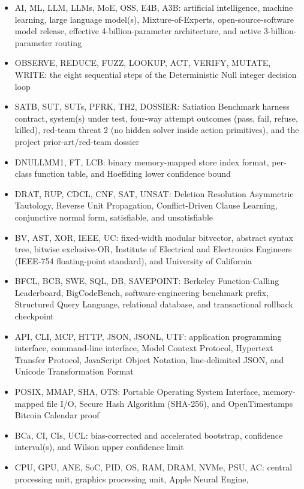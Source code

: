 \documentclass[10pt,letterpaper]{article}
\providecommand{\tightlist}{\setlength{\itemsep}{1pt}\setlength{\parskip}{0pt}}
\begin{document}
\begin{itemize}
\tightlist
\item
  AI, ML, LLM, LLMs, MoE, OSS, E4B, A3B: artificial intelligence,
  machine learning, large language model(s), Mixture-of-Experts,
  open-source-software model release, effective 4-billion-parameter
  architecture, and active 3-billion-parameter routing
\item
  OBSERVE, REDUCE, FUZZ, LOOKUP, ACT, VERIFY, MUTATE, WRITE: the eight
  sequential steps of the Deterministic Null integer decision loop
\item
  SATB, SUT, SUTs, PFRK, TH2, DOSSIER: Satiation Benchmark harness
  contract, system(s) under test, four-way attempt outcomes (pass, fail,
  refuse, killed), red-team threat 2 (no hidden solver inside action
  primitives), and the project prior-art/red-team dossier
\item
  DNULLMM1, FT, LCB: binary memory-mapped store index format, per-class
  function table, and Hoeffding lower confidence bound
\item
  DRAT, RUP, CDCL, CNF, SAT, UNSAT: Deletion Resolution Asymmetric
  Tautology, Reverse Unit Propagation, Conflict-Driven Clause Learning,
  conjunctive normal form, satisfiable, and unsatisfiable
\item
  BV, AST, XOR, IEEE, UC: fixed-width modular bitvector, abstract syntax
  tree, bitwise exclusive-OR, Institute of Electrical and Electronics
  Engineers (IEEE-754 floating-point standard), and University of
  California
\item
  BFCL, BCB, SWE, SQL, DB, SAVEPOINT: Berkeley Function-Calling
  Leaderboard, BigCodeBench, software-engineering benchmark prefix,
  Structured Query Language, relational database, and transactional
  rollback checkpoint
\item
  API, CLI, MCP, HTTP, JSON, JSONL, UTF: application programming
  interface, command-line interface, Model Context Protocol, Hypertext
  Transfer Protocol, JavaScript Object Notation, line-delimited JSON,
  and Unicode Transformation Format
\item
  POSIX, MMAP, SHA, OTS: Portable Operating System Interface,
  memory-mapped file I/O, Secure Hash Algorithm (SHA-256), and
  OpenTimestamps Bitcoin Calendar proof
\item
  BCa, CI, CIs, UCL: bias-corrected and accelerated bootstrap,
  confidence interval(s), and Wilson upper confidence limit
\item
  CPU, GPU, ANE, SoC, PID, OS, RAM, DRAM, NVMe, PSU, AC: central
  processing unit, graphics processing unit, Apple Neural Engine,

\end{itemize}
\end{document}
